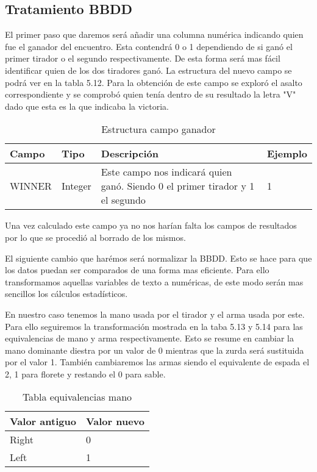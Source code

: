 \subsection{Tratamiento BBDD}

El primer paso que daremos será añadir una columna numérica indicando quien
fue el ganador del encuentro. Esta contendrá 0 o 1 dependiendo de si ganó
el primer tirador o el segundo respectivamente. De esta forma será mas fácil
identificar quien de los dos tiradores ganó. La estructura del nuevo campo
se podrá ver en la tabla 5.12. Para la obtención de este campo se exploró
el asalto correspondiente y se comprobó quien tenía dentro de su resultado
la letra "V" dado que esta es la que indicaba la victoria.

\begin{table}[]
  \centering
  \caption{Estructura campo ganador}
  \label{tab:Estructura campo ganador}
  \begin{tabular}{|llll|}
    \hline \rowcolor[HTML]{C0C0C0}
    Campo & Tipo & Descripción & Ejemplo \\ \hline
    WINNER & Integer & Este campo nos indicará quien ganó. Siendo 0 el primer tirador y 1 el segundo & 1 \\ \hline
  \end{tabular}
\end{table}

Una vez calculado este campo ya no nos harían falta los campos de resultados
por lo que se procedió al borrado de los mismos.

El siguiente cambio que harémos será normalizar la BBDD. Esto se hace para
que los datos puedan ser comparados de una forma mas eficiente. Para ello
transformamos aquellas variables de texto a numéricas, de este modo serán
mas sencillos los cálculos estadísticos.

En nuestro caso tenemos la mano usada por el tirador y el arma usada por este.
Para ello seguiremos la transformación mostrada en la taba 5.13 y 5.14 para
las equivalencias de mano y arma respectivamente. Esto se resume en
cambiar la mano dominante diestra por un valor de 0 mientras que la zurda será
sustituida por el valor 1. También cambiaremos las armas siendo el equivalente
de espada el 2, 1 para florete y restando el 0 para sable.

\begin{table}[]
  \centering
  \caption{Tabla equivalencias mano}
  \label{tab:Tabla equivalencias mano}
  \begin{tabular}{|ll|}
    \hline
    \rowcolor[HTML]{C0C0C0}
    Valor antiguo & Valor nuevo \\ \hline
    Right & 0 \\ \hline
    Left & 1 \\ \hline
  \end{tabular}
\end{table}

